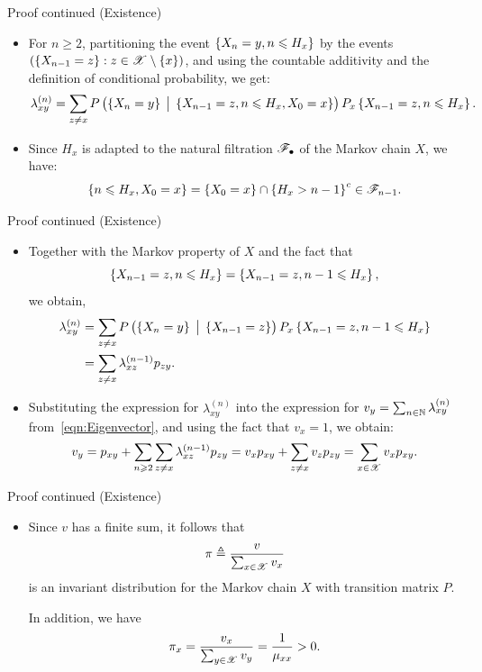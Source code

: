 \documentclass[12pt,aspectratio=169]{beamer}
\begin{document}
\begin{frame}
\begin{block}{Proof continued (Existence)}
\begin{itemize}
\item For $n \ge 2$, partitioning the event $\left\{X_n = y, n \leqslant H_x\right\}$ by the events $(\left\{X_{n-1} = z\right\} : z \in \mathscr{X} \setminus \left\{x\right\})$, and using the countable additivity and the definition of conditional probability, we get:
\[
\lambda_{xy}^{(n)} 
= \sum_{z \neq x} P\left(\left\{X_n = y\right\} \; \big\vert \; \left\{X_{n-1} = z, n \leqslant H_x, X_0 = x\right\}\right) P_x\left\{X_{n-1} = z, n \leqslant H_x\right\}.
\]

\item<2-> Since $H_x$ is adapted to the natural filtration $\mathscr{F}_\bullet$ of the Markov chain $X$, we have:
\[
\left\{n \leqslant H_x, X_0 = x\right\} = \left\{X_0 = x\right\} \cap \left\{H_x > n-1\right\}^c \in \mathscr{F}_{n-1}.
\]
\end{itemize}
\end{block}
\end{frame}


\begin{frame}
\begin{block}{Proof continued (Existence)}
\begin{itemize}
\item <1-> Together with the Markov property of $X$ and the fact that 
\[
\left\{X_{n-1}=z, n \leqslant H_x\right\} = \left\{X_{n-1}=z, n-1 \leqslant H_x\right\},
\]
we obtain,
\begin{align*}
\lambda_{xy}^{(n)} 
&= \sum_{z \neq x} P\left( \left\{X_n = y\right\} \; \big\vert \; \left\{X_{n-1} = z\right\} \right) P_x\left\{X_{n-1} = z, n-1 \leqslant H_x\right\} \\
&= \sum_{z \neq x} \lambda_{xz}^{(n-1)} p_{zy}.
\end{align*}

\item <2-> Substituting the expression for $\lambda_{xy}^{(n)}$ into the expression for $v_y = \sum_{n \in \mathbb{N}} \lambda_{xy}^{(n)}$ from~\eqref{eqn:Eigenvector}, and using the fact that $v_x = 1$, we obtain:
\[
v_y = p_{xy} + \sum_{n \geqslant 2} \sum_{z \neq x} \lambda_{xz}^{(n-1)} p_{zy}
= v_x p_{xy} + \sum_{z \neq x} v_z p_{z y}
= \sum_{x \in \mathscr{X}} v_x p_{x y}.
\]
\end{itemize}
\end{block}
\end{frame}

\begin{frame}
\begin{block}{Proof continued (Existence)}
\begin{itemize}
\item Since $v$ has a finite sum, it follows that
\[
\pi \triangleq \frac{v}{\sum_{x \in \mathscr{X}} v_x}
\]
is an invariant distribution for the Markov chain $X$ with transition matrix $P$.

In addition, we have
\[
\pi_x = \frac{v_x}{\sum_{y \in \mathscr{X}} v_y} = \frac{1}{\mu_{xx}} > 0.
\]

\end{itemize}
\end{block}
\end{frame}
\end{document}
